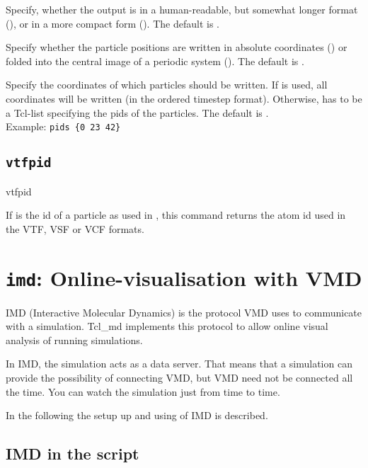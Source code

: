 \begin{arguments}
\item[\opt{\alt{short \asep verbose}}] Specify, whether the output is
  in a human-readable, but somewhat longer format (),
  or in a more compact form (). The default is
  .
  
\item[\opt{\alt{folded \asep absolute}}] Specify whether the particle
  positions are written in absolute coordinates ()
  or folded into the central image of a periodic system
  (). The default is .
  
\item[\opt{pids \alt{\var{pids} \asep all}}] Specify the coordinates
  of which particles should be written. If  is used, all
  coordinates will be written (in the ordered timestep format).
  Otherwise,  has to be a Tcl-list specifying the pids of
  the particles. The default is .\\
  Example: \verb!pids {0 23 42}!
  
\end{arguments}

\subsection{\texttt{vtfpid}}
\begin{essyntax}
  vtfpid 
\end{essyntax}
If  is the id of a particle as used in \es, this command
returns the atom id used in the VTF, VSF or VCF formats.

\section{\texttt{imd}: Online-visualisation with VMD}
IMD (Interactive Molecular Dynamics) is the protocol VMD uses to
communicate with a simulation. Tcl\_md implements this protocol to
allow online visual analysis of running simulations.

In IMD, the simulation acts as a data server. That means that a
simulation can provide the possibility of connecting VMD, but VMD need
not be connected all the time. You can watch the simulation just from
time to time.

In the following the setup up and using of IMD is described.

\subsection{IMD in the script}

